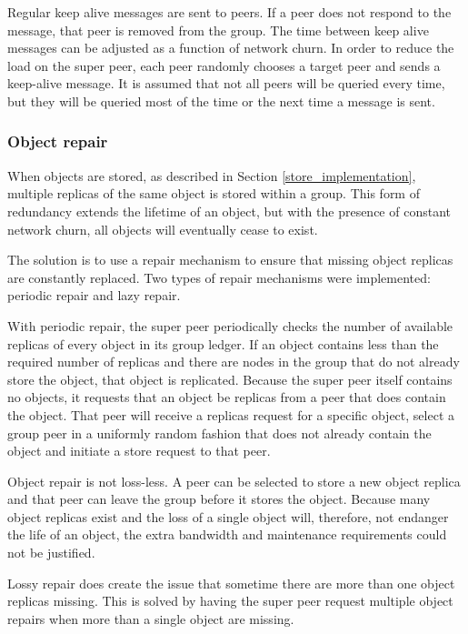 Regular keep alive messages are sent to peers. If a peer does not respond to the message, that peer is removed from the group. The time between keep alive messages can be adjusted as a function of network churn. In order to reduce the load on the super peer, each peer randomly chooses a target peer and sends a keep-alive message. It is assumed that not all peers will be queried every time, but they will be queried most of the time or the next time a message is sent.

    \subsubsection{Object repair}
    \label{object_repair_implementation}

When objects are stored, as described in Section \ref{store_implementation}, multiple replicas of the same object is stored within a group. This form of redundancy extends the lifetime of an object, but with the presence of constant network churn, all objects will eventually cease to exist.

The solution is to use a repair mechanism to ensure that missing object replicas are constantly replaced. Two types of repair mechanisms were implemented: periodic repair and lazy repair.

With periodic repair, the super peer periodically checks the number of available replicas of every object in its group ledger. If an object contains less than the required number of replicas and there are nodes in the group that do not already store the object, that object is replicated. Because the super peer itself contains no objects, it requests that an object be replicas from a peer that does contain the object. That peer will receive a replicas request for a specific object, select a group peer in a uniformly random fashion that does not already contain the object and initiate a store request to that peer.

Object repair is not loss-less. A peer can be selected to store a new object replica and that peer can leave the group before it stores the object. Because many object replicas exist and the loss of a single object will, therefore, not endanger the life of an object, the extra bandwidth and maintenance requirements could not be justified.

Lossy repair does create the issue that sometime there are more than one object replicas missing. This is solved by having the super peer request multiple object repairs when more than a single object are missing.

